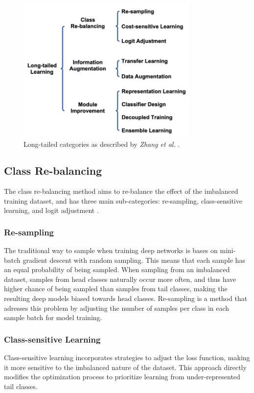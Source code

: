 \begin{figure}[ht]
    \centering
    \includegraphics[width=0.8\textwidth]{Images/lt_methods_categories.png} 
    \caption{Long-tailed categories as described by \textit{Zhang et al.} \cite{zhang2023deep}.}
    \label{fig:lt_main_categories} %
\end{figure}

\subsection{Class Re-balancing}
The class re-balancing method aims to re-balance the effect of the imbalanced training dataset, and has three main sub-categories: re-sampling, class-sensitive learning, and logit adjustment \cite{zhang2023deep}. 

\subsubsection{Re-sampling}
The traditional way to sample when training deep networks is bases on mini-batch gradient descent with random sampling. This means that each sample has an equal probability of being sampled. When sampling from an imbalanced dataset, samples from head classes naturally occur more often, and thus have higher chance of being sampled than samples from tail classes, making the resulting deep models biased towards head classes. Re-sampling is a method that adresses this problem by adjusting the number of samples per class in each sample batch for model training. 

\subsubsection{Class-sensitive Learning}
Class-sensitive learning incorporates strategies to adjust the loss function, making it more sensitive to the imbalanced nature of the dataset. This approach directly modifies the optimization process to prioritize learning from under-represented tail classes.

